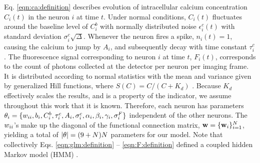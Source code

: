 Eq. \eqref{eqn:ca:definition} describes evolution of intracellular calcium concentration $C_i(t)$ in the neuron $i$ at time $t$. Under normal conditions, $C_i(t)$ fluctuates around the baseline level of $C_i^b$ with normally distributed noise $\epsilon^c_i(t)$ with standard deviation $\sigma^c_i \sqrt{\Delta}$.  Whenever the neuron fires a spike, $n_i(t)=1$, causing the calcium to jump by $A_i$, and subsequently decay with time constant $\tau^c_i$.  The fluorescence signal corresponding to neuron $i$ at time $t$, $F_i(t)$, corresponds to the count of photons collected at the detector per neuron per imaging frame. It is distributed according to normal statistics with the mean and variance given by generalized Hill functions, where $S(C)=C/(C+K_d)$ \cite{Yasuda2004}.  Because $K_d$ effectively scales the results, and is a property of the indicator, we assume throughout this work that it is known.  Therefore, each neuron has parameters $\mathbf{\theta}_i=\{w_{ii}, b_i, C^b_i, \tau^c_i, A_i, \sigma^c_i, \alpha_i, \beta_i, \gamma_i, \sigma^F_i\}$ independent of the other neurons.  The $w_{ii}$'s make up the diagonal of the functional connection matrix, $\mathbf{w}=\{\mathbf{w}_i\}_{i=1}^N$, yielding a total of $|\mathbf{\theta}|=(9+N)N$ parameters for our model.  
Note that collectively Eqs. \eqref{eqn:glm:definition} -- \eqref{eqn:F:definition} defined a coupled hidden Markov model (HMM) \cite{ShumwayStoffer06}.


